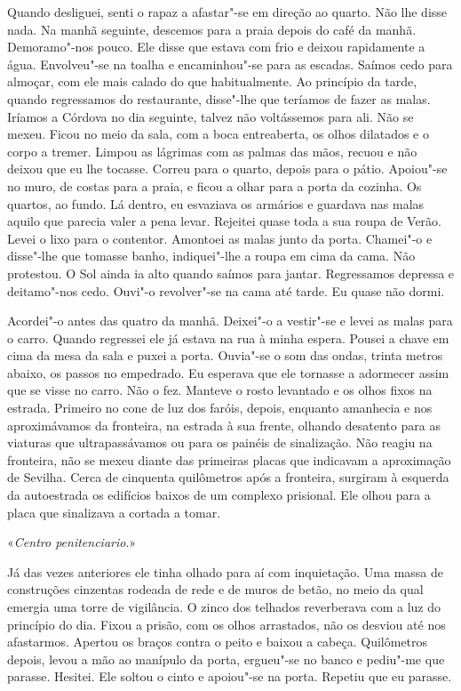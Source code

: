 Quando desliguei, senti o rapaz a afastar"-se em direção ao quarto. Não
lhe disse nada. Na manhã seguinte, descemos para a praia depois do
café da manhã. Demoramo"-nos pouco. Ele disse que estava com frio e
deixou rapidamente a água. Envolveu"-se na toalha e encaminhou"-se para
as escadas. Saímos cedo para almoçar, com ele mais calado do que
habitualmente. Ao princípio da tarde, quando regressamos do restaurante,
disse"-lhe que teríamos de fazer as malas. Iríamos a Córdova no dia
seguinte, talvez não voltássemos para ali. Não se mexeu. Ficou no meio
da sala, com a boca entreaberta, os olhos dilatados e o corpo a tremer.
Limpou as lágrimas com as palmas das mãos, recuou e não deixou que eu
lhe tocasse. Correu para o quarto, depois para o pátio. Apoiou"-se no
muro, de costas para a praia, e ficou a olhar para a porta da cozinha.
Os quartos, ao fundo. Lá dentro, eu esvaziava os armários e guardava nas
malas aquilo que parecia valer a pena levar. Rejeitei quase toda a sua
roupa de Verão. Levei o lixo para o contentor. Amontoei as malas junto
da porta. Chamei"-o e disse"-lhe que tomasse banho, indiquei"-lhe a
roupa em cima da cama. Não protestou. O Sol ainda ia alto quando saímos
para jantar. Regressamos depressa e deitamo"-nos cedo. Ouvi"-o
revolver"-se na cama até tarde. Eu quase não dormi.

Acordei"-o antes das quatro da manhã. Deixei"-o a vestir"-se e levei as
malas para o carro. Quando regressei ele já estava na rua à minha
espera. Pousei a chave em cima da mesa da sala e puxei a porta.
Ouvia"-se o som das ondas, trinta metros abaixo, os passos no empedrado.
Eu esperava que ele tornasse a adormecer assim que se visse no carro.
Não o fez. Manteve o rosto levantado e os olhos fixos na estrada.
Primeiro no cone de luz dos faróis, depois, enquanto amanhecia e nos
aproximávamos da fronteira, na estrada à sua frente, olhando desatento
para as viaturas que ultrapassávamos ou para os painéis de sinalização.
Não reagiu na fronteira, não se mexeu diante das primeiras placas que
indicavam a aproximação de Sevilha. Cerca de cinquenta quilômetros após
a fronteira, surgiram à esquerda da autoestrada os edifícios baixos de
um complexo prisional. Ele olhou para a placa que sinalizava a cortada a
tomar.

«\emph{Centro penitenciario}.»

Já das vezes anteriores ele tinha olhado para aí com inquietação. Uma
massa de construções cinzentas rodeada de rede e de muros de betão, no
meio da qual emergia uma torre de vigilância. O zinco dos telhados
reverberava com a luz do princípio do dia. Fixou a prisão, com os olhos
arrastados, não os desviou até nos afastarmos. Apertou os braços contra
o peito e baixou a cabeça. Quilômetros depois, levou a mão ao manípulo
da porta, ergueu"-se no banco e pediu"-me que parasse. Hesitei. Ele
soltou o cinto e apoiou"-se na porta. Repetiu que eu parasse.

